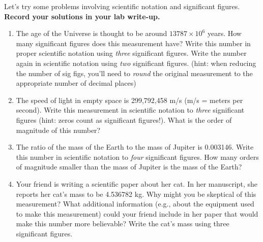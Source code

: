 \documentclass[11pt]{article}
\begin{document}
\bigskip

Let's try some problems involving scientific notation and significant figures. \textbf{Record your solutions in your lab write-up.}
\begin{enumerate}
    \item The age of the Universe is thought to be around $13787 \times 10^{6}$ years. How many significant figures does this measurement have? Write this number in proper scientific notation using \emph{three} significant figures. Write the number again in scientific notation using \emph{two} significant figures. (hint: when reducing the number of sig figs, you'll need to \emph{round} the original measurement to the appropriate number of decimal places) 
    
    \item The speed of light in empty space is 299,792,458 m/s (m/s = meters per second). Write this measurement in scientific notation to \emph{three} significant figures (hint: zeros count as significant figures!). What is the order of magnitude of this number?
    
    \item The ratio of the mass of the Earth to the mass of Jupiter is 0.003146. Write this number in scientific notation to \emph{four} significant figures. How many orders of magnitude smaller than the mass of Jupiter is the mass of the Earth?
    
    \item Your friend is writing a scientific paper about her cat. In her manuscript, she reports her cat's mass to be 4.536782 kg. Why might you be skeptical of this measurement? What additional information (e.g., about the equipment used to make this measurement) could your friend include in her paper that would make this number more believable? Write the cat's mass using three significant figures.
\end{enumerate}

\bigskip
\end{document}
